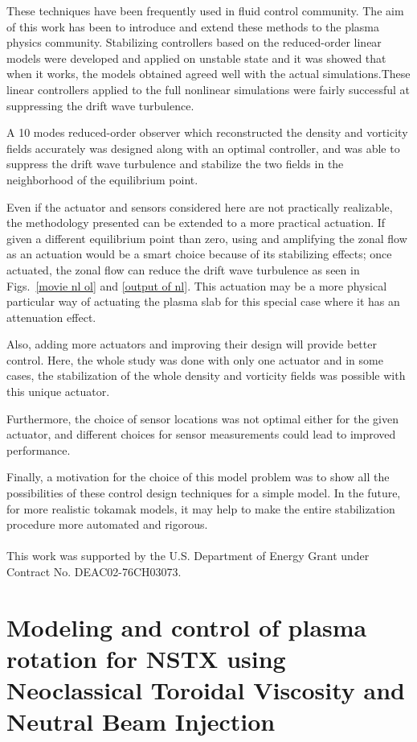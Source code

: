 \documentclass[12pt,lot, lof]{puthesis}
\begin{document}
These techniques have been frequently used in fluid control community.  The aim of this work has been to introduce and extend these methods to the plasma physics community. Stabilizing controllers based on the reduced-order linear models were developed and applied on unstable state and it was showed that when it works, the models obtained agreed well with the actual simulations.These linear controllers applied to the full nonlinear simulations were fairly successful at suppressing the drift wave turbulence.

A 10 modes reduced-order observer which reconstructed the density and vorticity fields accurately was designed along with an optimal controller, and was able to suppress the drift wave turbulence and stabilize the two fields in the neighborhood of the equilibrium point.

Even if the actuator and sensors considered here are not practically realizable, the methodology presented can be extended to a more practical actuation. If given a different equilibrium point than zero, using and amplifying the zonal flow as an actuation would be a smart choice because of its stabilizing effects; once actuated, the zonal flow can reduce the drift wave turbulence as seen in Figs.~\ref{movie nl ol} and \ref{output of nl}. This actuation may be a more physical particular way of actuating the plasma slab for this special case where it has an attenuation effect.

Also, adding more actuators and improving their design will provide better control. Here, the whole study was done with only one actuator and in some cases, the stabilization of the whole density and vorticity fields was possible with this unique actuator.

Furthermore, the choice of sensor locations was not optimal either for the given actuator, and different choices for sensor measurements could lead to improved performance. 

Finally, a motivation for the choice of this model problem was to show all the possibilities of these control design techniques for a simple model. In the future, for more realistic tokamak models, it may help to make the entire stabilization procedure more automated and rigorous.\\\\
%
This work was supported by the U.S. Department of Energy Grant under Contract No. DEAC02-76CH03073.


\chapter{Modeling and control of plasma rotation for NSTX using Neoclassical Toroidal Viscosity and Neutral Beam Injection}
\label{rot1&}
\end{document}
